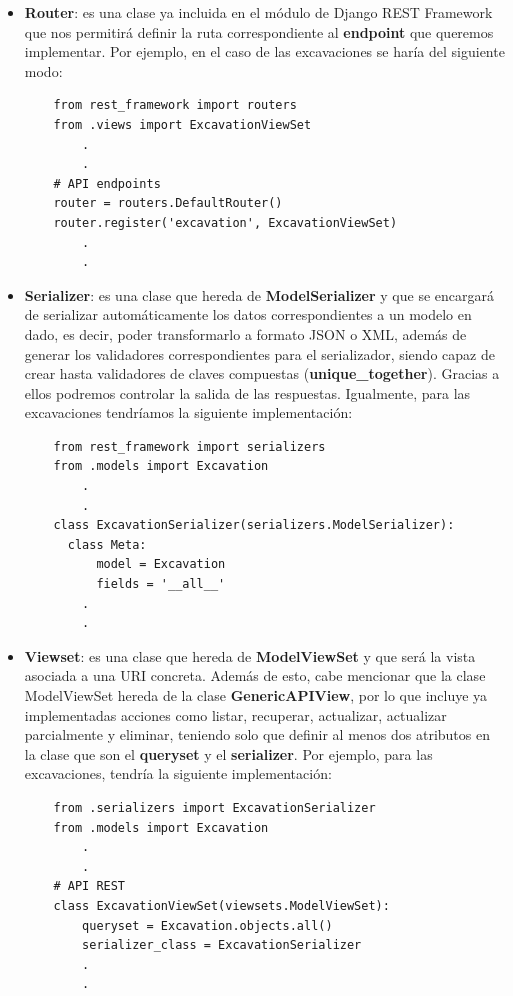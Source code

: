     \begin{itemize}
        \item \textbf{Router}: es una clase ya incluida en el módulo de Django REST
        Framework que nos permitirá definir la ruta correspondiente al \textbf{endpoint}
        que queremos implementar. Por ejemplo, en el caso de las excavaciones se haría del
        siguiente modo:
    \begin{verbatim}
    from rest_framework import routers
    from .views import ExcavationViewSet
        .
        .
    # API endpoints
    router = routers.DefaultRouter()
    router.register('excavation', ExcavationViewSet)
        .
        .
    \end{verbatim}

        \item \textbf{Serializer}: es una clase que hereda de \textbf{ModelSerializer}
        y que se encargará de serializar automáticamente los datos correspondientes a
        un modelo en dado, es decir, poder transformarlo a formato JSON o XML, además
        de generar los validadores correspondientes para el serializador, siendo capaz
        de crear hasta validadores de claves compuestas (\textbf{unique\_together}).
        Gracias a ellos podremos controlar la salida de las respuestas. Igualmente, para
        las excavaciones tendríamos la siguiente implementación:
    \begin{verbatim}
    from rest_framework import serializers
    from .models import Excavation
        .
        .
    class ExcavationSerializer(serializers.ModelSerializer):
      class Meta:
          model = Excavation
          fields = '__all__'
        .
        .
    \end{verbatim}

        \item \textbf{Viewset}: es una clase que hereda de \textbf{ModelViewSet} y que
        será la vista asociada a una URI concreta. Además de esto, cabe mencionar que
        la clase ModelViewSet hereda de la clase \textbf{GenericAPIView}, por lo que
        incluye ya implementadas acciones como listar, recuperar, actualizar, actualizar
        parcialmente y eliminar, teniendo solo que definir al menos dos atributos en la
        clase que son el \textbf{queryset} y el \textbf{serializer}. Por ejemplo, para las
        excavaciones, tendría la siguiente implementación:
    \begin{verbatim}
    from .serializers import ExcavationSerializer
    from .models import Excavation
        .
        .
    # API REST
    class ExcavationViewSet(viewsets.ModelViewSet):
        queryset = Excavation.objects.all()
        serializer_class = ExcavationSerializer
        .
        .
    \end{verbatim}
        

\end{itemize}
